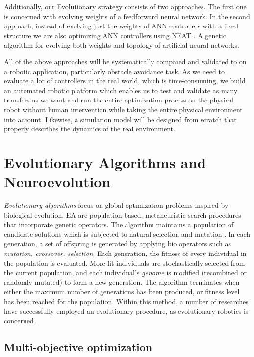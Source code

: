 Additionally, our Evolutionary strategy consists of two approaches. The first one is concerned with evolving weights of a feedforward neural network. In the second approach, instead of evolving just the weights of ANN controllers with a fixed structure we are also optimizing ANN controllers using NEAT \citep{stanley2002evolving}. A genetic algorithm for evolving both weights and topology of artificial neural networks.

All of the above approaches will be systematically compared and validated to on a robotic application, particularly obstacle avoidance task. As we need to evaluate a lot of controllers in the real world, which is time-consuming, we build an automated robotic platform which enables us to test and validate as many transfers as we want and run the entire optimization process on the physical robot without human intervention while taking the entire physical environment into account. Likewise, a simulation model will be designed from scratch that properly describes the dynamics of the real environment.

\section{Evolutionary Algorithms and Neuroevolution}

\emph{Evolutionary algorithms} focus on global optimization problems inspired by biological evolution. EA are population-based, metaheuristic search procedures that incorporate genetic operators. The algorithm maintains a population of candidate solutions which is subjected to natural selection and mutation \citep{back1996evolutionary}. In each generation, a set of offspring is generated by applying bio operators such as \emph{mutation, crossover, selection}. Each generation, the fitness of every individual in the population is evaluated. More fit individuals are stochastically selected from the current population, and each individual's \emph{genome} is modified (recombined or randomly mutated) to form a new generation. The algorithm terminates when either the maximum number of generations has been produced, or fitness level has been reached for the population. Within this method, a number of researches have successfully employed an evolutionary procedure, as evolutionary robotics is concerned \citep{salomon1999evolving} \citep{faina2017automating}.

\subsection{Multi-objective optimization}


